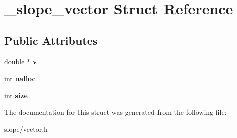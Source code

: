 \hypertarget{struct__slope__vector}{\section{\+\_\+slope\+\_\+vector Struct Reference}
\label{struct__slope__vector}
}
\subsection*{Public Attributes}
\begin{DoxyCompactItemize}
\item 
\hypertarget{struct__slope__vector_a7b6b1ef243e1c3a288ec1ae932512e1f}{double $\ast$ {\bfseries v}}\label{struct__slope__vector_a7b6b1ef243e1c3a288ec1ae932512e1f}

\item 
\hypertarget{struct__slope__vector_a2bea13c3c5345b2540bf810ef117e7ab}{int {\bfseries nalloc}}\label{struct__slope__vector_a2bea13c3c5345b2540bf810ef117e7ab}

\item 
\hypertarget{struct__slope__vector_a2635b20c85067423e4f3482e9557613e}{int {\bfseries size}}\label{struct__slope__vector_a2635b20c85067423e4f3482e9557613e}

\end{DoxyCompactItemize}


The documentation for this struct was generated from the following file\+:\begin{DoxyCompactItemize}
\item 
slope/vector.\+h\end{DoxyCompactItemize}
